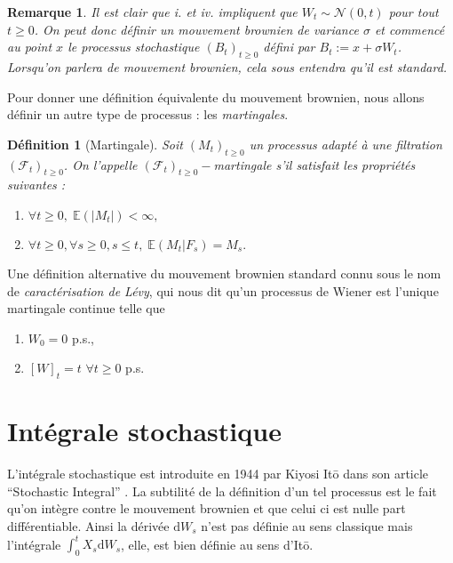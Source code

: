 \documentclass[openany]{book}
\newcommand{\F}{\mathscr{F}}
\newcommand{\E}{\mathbb{E}}
\newcommand{\1}{\mathbbm{1}}
\renewcommand{\d}{\mathrm{d}}
\theoremstyle{thmfont}
\theoremstyle{deffont}
\newtheorem{definition}[definition]{Définition}
\theoremstyle{thmfont}
\theoremstyle{deffont}
\newtheorem{remark}[remark]{Remarque}
\begin{document}
\begin{remark}
  Il est clair que \textit{i.} et \textit{iv.} impliquent que $W_t \sim \mathcal{N}(0,t)$ pour tout $t \geq 0$. On peut donc définir un mouvement brownien de variance $\sigma$ et commencé au point $x$ le processus stochastique $(B_t)_{t\geq0}$ défini par $B_t := x + \sigma W_t$. Lorsqu'on parlera de mouvement brownien, cela sous entendra qu'il est standard.
\end{remark}

Pour donner une définition équivalente du mouvement brownien, nous allons définir un autre type de processus : les \textit{martingales}.

  \begin{definition}[Martingale]
  Soit $(M_t)_{t\geq0}$ un processus adapté à une filtration $(\F_t)_{t\geq0}$. On l'appelle $(\F_t)_{t\geq0}-$\textit{martingale} s'il satisfait les propriétés suivantes : 
  \begin{enumerate}
  \item $\forall t\geq 0,\;\E\left(|M_t|\right) < \infty,$
  \item $\forall t\geq 0, \forall s \geq 0, s \leq t,\;\E\left(M_t|F_s\right) = M_s.$
  \end{enumerate}
  \end{definition}
Une définition alternative du mouvement brownien standard connu sous le nom de \textit{caractérisation de Lévy}, qui nous dit qu'un processus de Wiener est l'unique martingale continue telle que
\begin{enumerate}
\item $W_0 = 0$ p.s.,
\item $[W]_t = t$ $\forall t\geq0$ p.s.
  \label{def:MvtBorwnien_caractLevy}
\end{enumerate}


\section{Intégrale stochastique}
L'intégrale stochastique est introduite en 1944 par Kiyosi Itō dans son article ``Stochastic Integral'' \cite{ito1944}. La subtilité de la définition d'un tel processus est le fait qu'on intègre contre le mouvement brownien et que celui ci est nulle part différentiable. Ainsi la dérivée $\d W_s$ n'est pas définie au sens classique mais l'intégrale $\int_0^t X_s \d W_s$, elle, est bien définie au sens d'Itō.
\end{document}
